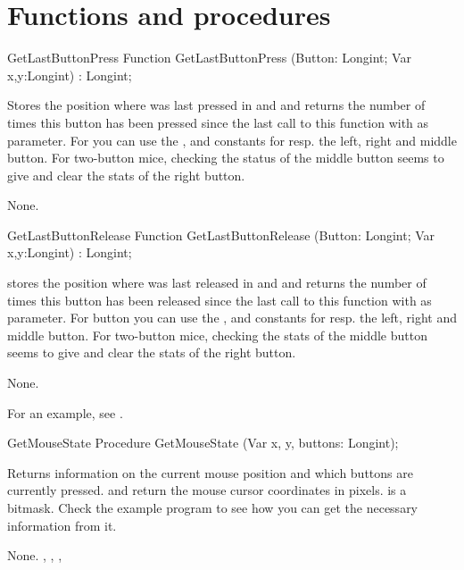 \section{Functions and procedures}
\begin{function}{GetLastButtonPress}
\Declaration
Function GetLastButtonPress (Button: Longint; Var x,y:Longint) : Longint;

\Description
 
Stores the position where  was last pressed in  and
 and returns
the number of times this button has been pressed since the last call to this
function with  as parameter. For  you can use the 
,  and  constants for resp. the left, 
right and middle button.
For two-button mice, checking the status of the middle button seems to give
and clear the stats of the right button.

\Errors
None.
\SeeAlso
{}
\end{function}
\latex{}
\html{}
\begin{function}{GetLastButtonRelease}
\Declaration
Function GetLastButtonRelease (Button: Longint; Var x,y:Longint) : Longint;

\Description

stores the position where  was last released in  and 
 and returns
the number of times this button has been released since the last call to this
function with  as parameter. For button you can use the
,  and  constants for resp. 
the left, right and middle button.
For two-button mice, checking the stats of the middle button seems to give
and clear the stats of the right button.

\Errors
None.
\SeeAlso
{}
\end{function}
For an example, see .
\begin{procedure}{GetMouseState}
\Declaration
Procedure GetMouseState (Var x, y, buttons: Longint);

\Description

 Returns information on the current mouse position 
and which buttons are currently pressed.
 and  return the mouse cursor coordinates in pixels.
 is a bitmask. Check the example program to see how you can get the
necessary information from it.

\Errors
None.
\SeeAlso
{}, , ,
\end{procedure}
